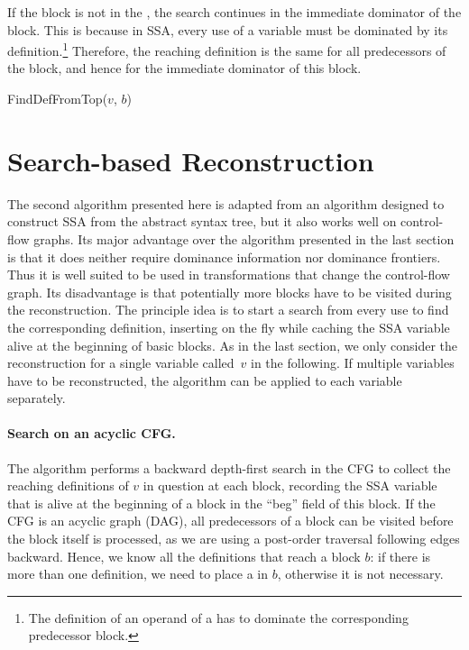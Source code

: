 {If the block is not in the \iDF, the search continues in the immediate dominator of the block. 
This is because in SSA, every use of a variable must be dominated by its definition.\footnote{The definition of an operand of a \phifun has to dominate the corresponding predecessor block.}
Therefore, the reaching definition is the same for all predecessors of the block, and hence for the immediate dominator of this block.

\begin{procedure}
  \caption{FindDefFromTop($v$, $b$)}
  \label{proc:def-from-end-ssaconstr}
\end{procedure}

\section{Search-based Reconstruction}


The second algorithm presented here is adapted from an algorithm designed to construct SSA from the abstract syntax tree, but it also works well on control-flow graphs.
Its major advantage over the algorithm presented in the last section is that it does neither require dominance information nor dominance frontiers.
Thus it is well suited to be used in transformations that change the control-flow graph.
Its disadvantage is that potentially more blocks have to be visited during the reconstruction.
The principle idea is to start a search from every use to find the corresponding definition, inserting \phifuns on the fly while caching the SSA variable alive at the beginning of basic blocks.
As in the last section, we only consider the reconstruction for a single variable called~$v$ in the following.
If multiple variables have to be reconstructed, the algorithm can be applied to each variable separately.

\paragraph{Search on an acyclic CFG.}
The algorithm performs a backward depth-first search in the CFG to collect the reaching definitions of $v$ in question at each block,
recording the SSA variable that is alive at the beginning of a block in the ``beg'' field of this block.
If the CFG is an acyclic graph (DAG), all predecessors of a block can be visited before the block itself is processed, as we are using a post-order traversal following edges backward.
Hence, we know all the definitions that reach a block $b$: if there is more than one definition, we need to place a \phifun in $b$, otherwise it is not necessary.

}

